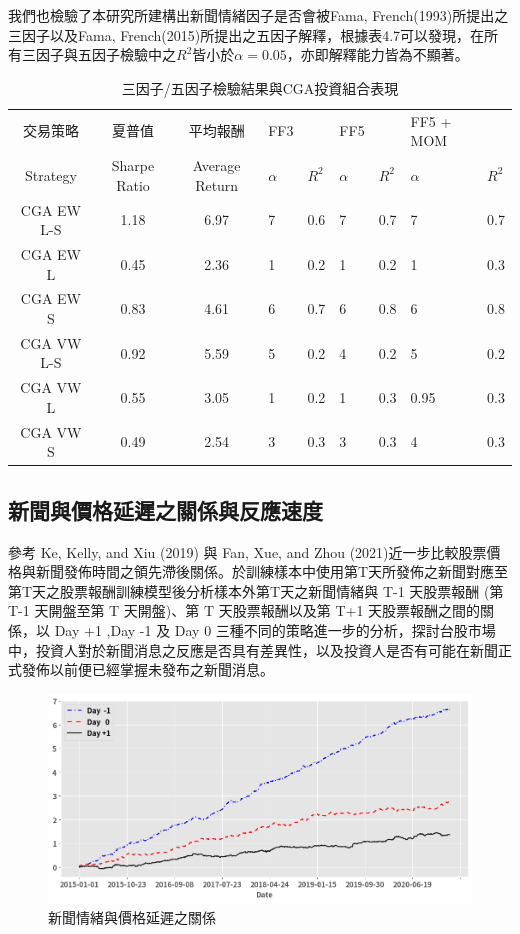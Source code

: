 我們也檢驗了本研究所建構出新聞情緒因子是否會被Fama, French(1993)所提出之三因子以及Fama, French(2015)所提出之五因子解釋，根據表4.7可以發現，在所有三因子與五因子檢驗中之$R^{2}$皆小於$\alpha = 0.05$，亦即解釋能力皆為不顯著。
\begin{table}[H]
\begin{center}
\begin{tabular}[c]{cccm{1cm}<{\centering}m{1cm}<{\centering}m{1cm}<{\centering}m{1cm}<{\centering}m{1cm}<{\centering}m{1cm}<{\centering}}
\toprule
交易策略 & 夏普值  & 平均報酬 & FF3 &  & FF5 &  & FF5 + MOM & \\

Strategy & Sharpe Ratio & Average Return & $\alpha$ &  $R^{2}$  & $\alpha$ &  $R^{2}$ & $\alpha$ &  $R^{2}$ \\
\hline
CGA EW L-S & 1.18 & 6.97 & 7 & 0.6 & 7 & 0.7 & 7 & 0.7 \\
CGA EW L & 0.45 & 2.36 & 1 & 0.2 & 1 & 0.2 & 1 & 0.3\\
CGA EW S & 0.83 & 4.61 & 6 & 0.7 & 6 & 0.8 & 6 & 0.8\\
CGA VW L-S & 0.92 & 5.59 & 5 & 0.2 & 4 & 0.2 & 5 & 0.2\\
CGA VW L & 0.55 & 3.05 & 1 & 0.2 & 1 & 0.3 & 0.95 & 0.3\\
CGA VW S & 0.49 & 2.54 & 3 & 0.3 & 3 & 0.3 & 4 & 0.3\\
\bottomrule
\end{tabular}
\end{center}
\caption{三因子/五因子檢驗結果與CGA投資組合表現}
\label{Tab 4.7}
\end{table}
\subsection{新聞與價格延遲之關係與反應速度}
參考 Ke, Kelly, and Xiu (2019) 與 Fan, Xue, and Zhou (2021)近一步比較股票價格與新聞發佈時間之領先滯後關係。於訓練樣本中使用第T天所發佈之新聞對應至第T天之股票報酬訓練模型後分析樣本外第T天之新聞情緒與 T-1 天股票報酬 (第 T-1 天開盤至第 T 天開盤)、第 T 天股票報酬以及第 T+1 天股票報酬之間的關係，以 Day +1 ,Day -1 及 Day 0 三種不同的策略進一步的分析，探討台股市場中，投資人對於新聞消息之反應是否具有差異性，以及投資人是否有可能在新聞正式發佈以前便已經掌握未發布之新聞消息。
\begin{figure}[htbp]
\centering
\includegraphics[width=1.1\textwidth]{images/speed0.png}
\caption{新聞情緒與價格延遲之關係}
\end{figure}

